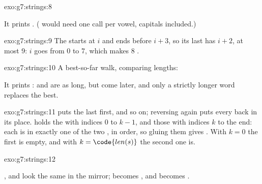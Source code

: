 \begin{solution}{exo:g7:strings:8}
\label{lst:g7:strings:sol-star}

It prints . ( would need one call
per vowel, capitals included.)
\end{solution}

\begin{solution}{exo:g7:strings:9}
The  starts at  $i$ and ends before $i + 3$, so its last 
has  $i + 2$, at most 9: $i$ goes from 0 to 7, which makes 8 .
\end{solution}

\begin{solution}{exo:g7:strings:10}
A best-so-far walk, comparing lengths:

\label{lst:g7:strings:sol-longest}

It prints :  and  are as long, but come
later, and only a strictly longer word replaces the best.
\end{solution}

\begin{solution}{exo:g7:strings:11}
 puts the last  first, and so on; reversing again puts
every  back in its place.  holds the  with
indices 0 to $k - 1$, and  those with indices $k$ to the end: each
 is in exactly one of the two , in order, so gluing them gives
. With $k = 0$ the first  is empty, and with $k = \code{len(s)}$
the second one is.
\end{solution}

\begin{solution}{exo:g7:strings:12}
\label{lst:g7:strings:sol-mirror}

,  and  look the same in the mirror; 
becomes , and  becomes .
\end{solution}

